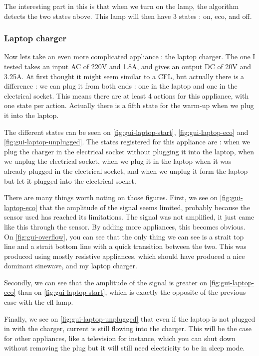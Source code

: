 The interesting part in this is that when we turn on the lamp, the algorithm detects the two states above. This lamp will then have 3 states : on, eco, and off.

\subsubsection{Laptop charger}
Now lets take an even more complicated appliance : the laptop charger. The one I tested takes an input AC of 220V and 1.8A, and gives an output DC of 20V and 3.25A.
At first thought it might seem similar to a CFL, but actually there is a difference : we can plug it from both ends : one in the laptop and one in the electrical socket. This means there are at least 4 actions for this appliance, with one state per action. Actually there is a fifth state for the warm-up when we plug it into the laptop.

The different states can be seen on \autoref{fig:gui-laptop-start}, \autoref{fig:gui-laptop-eco} and \autoref{fig:gui-laptop-unplugged}. The states registered for this appliance are : when we plug the charger in the electrical socket without plugging it into the laptop, when we unplug the electrical socket, when we plug it in the laptop when it was already plugged in the electrical socket, and when we unplug it form the laptop but let it plugged into the electrical socket.

There are many things worth noting on those figures. First, we see on \autoref{fig:gui-laptop-eco} that the amplitude of the signal seems limited, probably because the sensor used has reached its limitations. The signal was not amplified, it just came like this through the sensor. By adding more appliances, this becomes obvious. On \autoref{fig:gui-overflow}, you can see that the only thing we can see is a strait top line and a strait bottom line with a quick transition between the two. This was produced using mostly resistive appliances, which should have produced a nice dominant sinewave, and my laptop charger.

Secondly, we can see that the amplitude of the signal is greater on \autoref{fig:gui-laptop-eco} than on \autoref{fig:gui-laptop-start}, which is exactly  the opposite of the previous case with the \acrshort{cfl} lamp.

Finally, we see on \autoref{fig:gui-laptop-unplugged} that even if the laptop is not plugged in with the charger, current is still flowing into the charger. This will be the case for other appliances, like a television for instance, which you can shut down without removing the plug but it will still need electricity to be in sleep mode.


